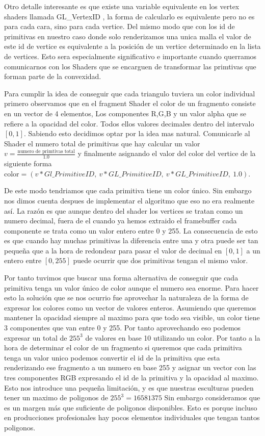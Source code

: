 Otro detalle interesante es que existe una variable equivalente en los vertex shaders llamada GL\_VertexID \cite{khronosGlVertexIDOpenGL}, la forma de calcularlo es equivalente pero no es para cada cara, sino para cada vertice. Del mismo modo que con los id de primitivas en nuestro caso donde solo renderizamos una unica malla el valor de este id de vertice es equivalente a la posición de un vertice determinado en la lista de vertices. Esto sera especialmente significativo e importante cuando querramos comunicarnos con los Shaders que se encarguen de transformar las primtivas que forman parte de la convexidad.

Para cumplir la idea de conseguir que cada triangulo tuviera un color individual primero observamos que en el fragment Shader el color de un fragmento consiste en un vector de 4 elementos, Los componentes R,G,B y un valor alpha que se refiere a la opacidad del color. Todos ellos valores decimales dentro del intervalo $[0,1]$. Sabiendo esto decidimos optar por la idea mas natural. Comunicarle al Shader el numero total de primitivas que hay calcular un valor $v=\frac{\text{numero de primtivas total}}{1.0}$ y finalmente asignando el valor del color del vertice de la siguiente forma $\text{color}=(v*{Gl\_PrimitiveID} , \ v*{GL\_PrimitiveID}, \ v*{GL\_PrimitiveID}, \ 1.0)$.

De este modo tendriamos que cada primitiva tiene un color único. Sin embargo nos dimos cuenta despues de implementar el algoritmo que eso no era realmente así. La razón es que aunque dentro del shader los vertices se tratan como un numero decimal, fuera de el cuando ya hemos extraido el framebuffer cada componente se trata como un valor entero entre 0 y 255. La consecuencia de esto es que cuando hay muchas primitivas la diferencia entre una y otra puede ser tan pequeña que a la hora de redondear para pasar el valor de decimal en $[0,1]$ a un entero entre $[0,255]$ puede ocurrir que dos primitivas tengan el mismo valor.

Por tanto tuvimos que buscar una forma alternativa de conseguir que cada primitiva tenga un valor único de color aunque el numero sea enorme. Para hacer esto la solución que se nos ocurrio fue aprovechar la naturaleza de la forma de expresar los colores como un vector de valores enteros. Asumiendo que queremos mantener la opacidad siempre al maximo para que todo sea visible, un color tiene 3 componentes que van entre 0 y 255. Por tanto aprovechando eso podemos expresar un total de $255^3$ de valores en base 10 utilizando un color. Por tanto a la hora de determinar el color de un fragmento si queremos que cada primitiva tenga un valor unico podemos convertir el id de la primitiva que esta renderizando ese fragmento
a un numero en base 255 y asignar un vector con las tres componentes RGB expresando el id de la primitiva y la opacidad al maximo. Esto nos introduce una pequeña limitación, y es que nuestras esculturas pueden tener un maximo de poligonos de $255^3=16581375$ Sin embargo consideramos que es un margen más que suficiente de poligonos disponibles. Esto es porque incluso en producciones profesionales hay pocos elementos individuales que tengan tantos poligonos.


